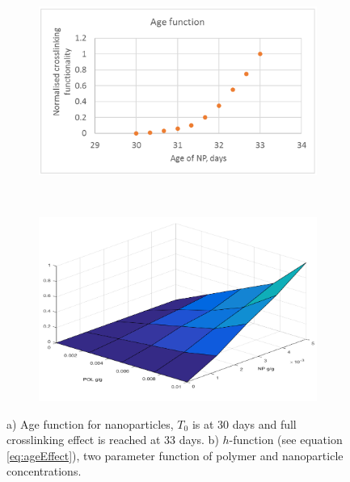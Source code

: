 \begin{figure}[h] %
    \begin{subfigure}{\textwidth}
    \centering
    \includegraphics[width=\textwidth]{img/cht/ageFunc.png}
    \caption{}
    \label{cht:ageFunc}
    \end{subfigure}
    \\
    \begin{subfigure}{\textwidth}
    \centering
    \includegraphics[width=\textwidth]{img/cht/hFunc.png}
    \caption{}
    \label{cht:hFunc}
    \end{subfigure}
    
    \caption{a) Age function for nanoparticles, $T_0$ is at 30 days and full crosslinking effect is reached at 33 days. b) $h$-function (see equation \ref{eq:ageEffect}), two parameter function of polymer and nanoparticle concentrations. }
    \label{cht:ageAndH}
\end{figure}

